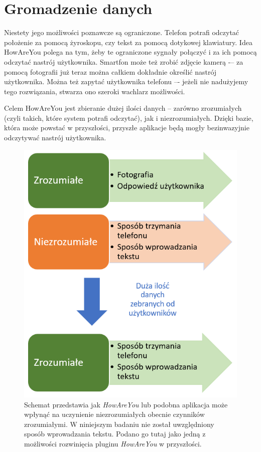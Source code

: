 \section{Gromadzenie danych}
\label{sec:gromadzenieDanych}

Niestety jego możliwości poznawcze są ograniczone. Telefon potrafi odczytać położenie za pomocą żyroskopu, czy tekst za pomocą dotykowej klawiatury. Idea HowAreYou polega na tym, żeby te ograniczone sygnały połączyć i za ich pomocą odczytać nastrój użytkownika. Smartfon może też zrobić zdjęcie kamerą -– za pomocą fotografii już teraz można całkiem dokładnie określić nastrój użytkownika. Można też zapytać użytkownika telefonu –- jeżeli nie nadużyjemy tego rozwiązania, stwarza ono szeroki wachlarz możliwości.

Celem HowAreYou jest zbieranie dużej ilości danych -- zarówno zrozumiałych (czyli takich, które system potrafi odczytać), jak i niezrozumiałych. Dzięki bazie, która może powstać w przyszłości, przyszłe aplikacje będą mogły bezinwazyjnie odczytywać nastrój użytkownika.

\begin{figure}[H]
	\centering
	\includegraphics[scale=0.7]{rozdzial1/gromadzenieDanych.png}
	\caption{Schemat przedstawia jak \textit{HowAreYou} lub podobna aplikacja może wpłynąć na uczynienie niezrozumiałych obecnie czynników zrozumiałymi. W niniejszym badaniu nie został uwzględniony sposób wprowadzania tekstu. Podano go tutaj jako jedną z możliwości rozwinięcia pluginu \textit{HowAreYou} w przyszłości.}
\end{figure}

